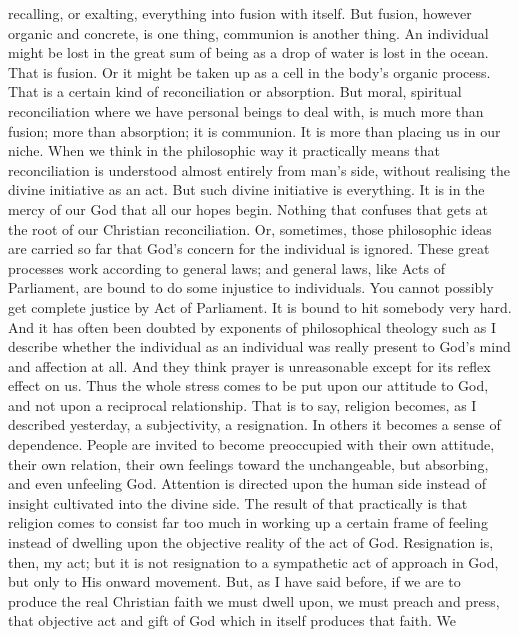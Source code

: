 \documentclass[12pt,letterpaper,oneside]{book}
\begin{document}
recalling, or exalting, everything into fusion 
with itself. But fusion, however organic and 
concrete, is one thing, communion is another 
thing. An individual might be lost in the great 
sum of being as a drop of water is lost in the 
ocean. That is fusion. Or it might be taken 
up as a cell in the body's organic process. 
That is a certain kind of reconciliation or 
absorption. But moral, spiritual reconciliation  
where we have personal beings to deal with, 
is much more than fusion; more than absorption; 
it is communion. It is more than placing 
us in our niche. When we think in the philosophic 
way it practically means that reconciliation 
is understood almost entirely from man's 
side, without realising the divine initiative as an 
act. But such divine initiative is everything. 
It is in the mercy of our God that all our hopes 
begin. Nothing that confuses that gets at the 
root of our Christian reconciliation. Or, sometimes,
those philosophic ideas are carried so far 
that God's concern for the individual is ignored. 
These great processes work according to general 
laws; and general laws, like Acts of Parliament, 
are bound to do some injustice to individuals. 
You cannot possibly get complete justice by Act 
of Parliament. It is bound to hit somebody 
very hard. And it has often been doubted by 
exponents of philosophical theology such as I 
describe whether the individual as an individual 
was really present to God's mind and affection 
at all. And they think prayer is unreasonable 
except for its reflex effect on us. Thus the 
whole stress comes to be put upon our attitude 
to God, and not upon a reciprocal relationship. 
That is to say, religion becomes, as I described 
yesterday, a subjectivity, a resignation. In 
others it becomes a sense of dependence. People 
are invited to become preoccupied with their 
own attitude, their own relation, their own 
feelings toward the unchangeable, but absorbing, 
and even unfeeling God. Attention is 
directed upon the human side instead of insight 
cultivated into the divine side. The result of 
that practically is that religion comes to consist 
far too much in working up a certain frame of 
feeling instead of dwelling upon the objective 
reality of the act of God. Resignation is, 
then, my act; but it is not resignation to 
a sympathetic act of approach in God, but 
only to His onward movement. But, as I 
have said before, if we are to produce the real 
Christian faith we must dwell upon, we must 
preach and press, that objective act and gift of 
God which in itself produces that faith. We 
\end{document}
